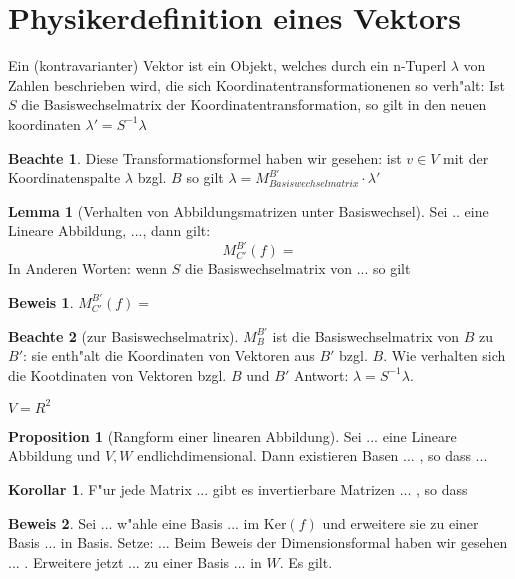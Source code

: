 \documentclass[oneside,fontsize=11pt,paper=a4,BCOR=0mm,DIV=12,automark,headsepline]{scrbook}
\theoremstyle{remark}
\theoremstyle{definition}
\newtheorem*{notte}{Beachte}
\newtheorem*{proposition}{Proposition}
\newtheorem{lemma}{Lemma}[section]
\newtheorem*{korollar}{Korollar}
\theoremstyle{definition}
\newtheorem*{prof}{Beweis}
\theoremstyle{remark}
\begin{document}
\section{Physikerdefinition eines Vektors}
\label{sec:phyv}

Ein (kontravarianter) Vektor ist ein Objekt, welches durch ein n-Tuperl \(\lambda\)
von Zahlen beschrieben wird, die sich Koordinatentransformationenen so
verh"alt: Ist $S$ die Basiswechselmatrix der Koordinatentransformation, so gilt
in den neuen koordinaten $\lambda'=S^{-1}\lambda$

\begin{notte}
  Diese Transformationsformel haben wir gesehen: ist $v\in V$ mit der
  Koordinatenspalte $\lambda$ bzgl. $B$ so gilt
  $\lambda=M^{B'}_{Basiswechselmatrix}\cdot \lambda ' $
\end{notte}

\begin{lemma}[Verhalten von Abbildungsmatrizen unter Basiswechsel]
Sei .. eine Lineare Abbildung, ..., dann gilt:
\[
  M^{B'}_{C'}(f)=
\] In Anderen Worten: wenn $S$ die Basiswechselmatrix von ... so gilt
\end{lemma}

\begin{prof}
  $M^{B'}_{C'}(f)=$
\end{prof}

\begin{notte}[zur Basiswechselmatrix]
  $ M^{B'}_{B}$ ist die Basiswechselmatrix von $B$ zu $B'$: sie enth"alt die
  Koordinaten von Vektoren aus $B'$ bzgl. $B$. Wie verhalten sich die
  Kootdinaten von Vektoren bzgl. $B$ und $B'$ Antwort: $\lambda =
  S^{-1}\lambda$.
\end{notte}

\begin{exa}
  $V=R^{2}$
\end{exa}

\begin{proposition}[Rangform einer linearen Abbildung]
  Sei ... eine Lineare Abbildung und $V,W$ endlichdimensional. Dann existieren
  Basen ... , so dass ...
\end{proposition}

\begin{korollar}
  F"ur jede Matrix ... gibt es invertierbare Matrizen ... , so dass
\end{korollar}

\begin{prof}
  Sei ... w"ahle eine Basis ... im $\text{Ker}(f)$  und erweitere sie zu einer
  Basis ... in Basis. Setze: ... Beim Beweis der Dimensionsformal haben wir
  gesehen ... . Erweitere jetzt ... zu einer Basis ... in $W$. Es gilt. 
\end{prof}
\end{document}
